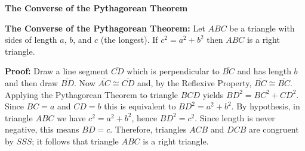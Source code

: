 \documentclass[12pt]{article}
\begin{document}
\begin{center}
\Large{\textbf{The Converse of the Pythagorean Theorem}}
\end{center}
\textbf{The Converse of the Pythagorean Theorem:} Let $ABC$ be a triangle with sides of length $a$, $b$, and $c$ (the longest). If $c^2=a^2+b^2$ then 
$ABC$ is a right triangle.
\begin{center}
\end{center}

\noindent\textbf{Proof:} Draw a line segment $\overline{CD}$ which is 
perpendicular to $\overline{BC}$ and has length $b$ and then draw
$\overline{BD}$. Now $\overline{AC} \cong \overline{CD}$ and, by the
Reflexive Property, $\overline{BC} \cong \overline{BC}$. Applying the
Pythagorean Theorem to triangle $BCD$ yields $BD^2=BC^2+CD^2$.
Since $BC=a$ and $CD=b$ this is equivalent to $BD^2=a^2+b^2$.
By hypothesis, in triangle $ABC$ we have $c^2=a^2+b^2$, hence
$BD^2=c^2$. Since length is never negative, this means $BD=c$. 
Therefore, triangles $ACB$ and $DCB$ are congruent by $SSS$; it follows
that triangle $ABC$ is a right triangle.
\end{document}

